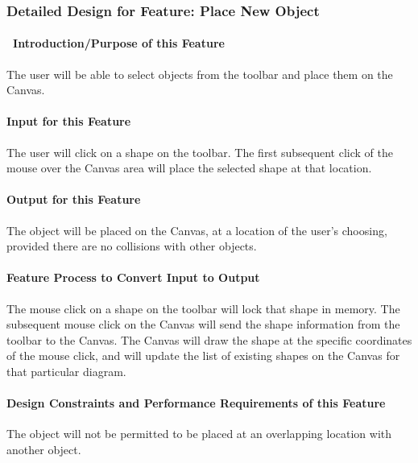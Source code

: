 \documentclass[twoside,letterpaper]{article}
\begin{document}
{\subsubsection{Detailed Design for Feature: Place New Object }

\paragraph[\ Introduction/Purpose of this Feature]
{\ Introduction/Purpose of this Feature}
{\color{black}
The user will be able to select objects from the toolbar and place them on the Canvas.
}

\paragraph[Input for this Feature]{Input for this Feature}
{\color{black}
The user will click on a shape on the toolbar.  The first subsequent click of the mouse over the Canvas area will place the selected shape at that location.
}

\paragraph{Output for this Feature}
{\color{black}
The object will be placed on the Canvas, at a location of the user{\textquoteright}s choosing, provided there are no collisions with other objects.
}

\paragraph{Feature Process to Convert Input to Output}
{\color{black}
The mouse click on a shape on the toolbar will lock that shape in memory.
The subsequent mouse click on the Canvas will send the shape information from the toolbar to the Canvas.  
The Canvas will draw the shape at the specific coordinates of the mouse click, and will update the list of existing shapes on the Canvas for that particular diagram.
}

\paragraph{Design Constraints and Performance Requirements of this Feature}
{\color{black}
The object will not be permitted to be placed at an overlapping location with another object.
}
\bigskip
\bigskip

}
\end{document}
